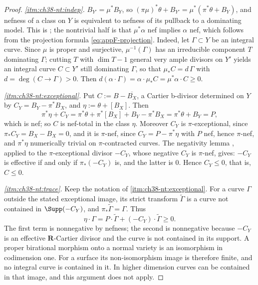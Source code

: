 \begin{proof}
\emph{\cref{itm:ch38-nt:indep}.}  $B_{Y'}=\mu^*B_Y$, so
$(\pi\mu)^*\theta+B_{Y'}=\mu^*(\pi^*\theta+B_Y)$, and nefness of a class
on $Y$ is equivalent to nefness of its pullback to a dominating model.
This is ; the nontrivial half is that
$\mu^*\alpha$ nef implies $\alpha$ nef, which follows from the
projection formula \eqref{eq:appF-projection}.  Indeed, let
$\Gamma\subset Y$ be an integral curve.  Since $\mu$ is proper and
surjective, $\mu^{-1}(\Gamma)$ has an irreducible component $T$
dominating $\Gamma$; cutting $T$ with $\dim T-1$ general very ample
divisors on $Y'$ yields an integral curve $C\subset Y'$ still
dominating $\Gamma$, so that $\mu_*C=d\,\Gamma$ with
$d=\deg(C\to\Gamma)>0$.  Then
$d(\alpha\cdot\Gamma)=\alpha\cdot\mu_*C=\mu^*\alpha\cdot C\geq0$.

\emph{\cref{itm:ch38-nt:exceptional}.}  Put $C:=B-\overline{B_X}$, a
Cartier b-divisor determined on $Y$ by $C_Y=B_Y-\pi^*B_X$, and
$\eta:=\theta+[B_X]$.  Then
\[
 \pi^*\eta+C_Y=\pi^*\theta+\pi^*[B_X]+B_Y-\pi^*B_X=\pi^*\theta+B_Y=P,
\]
which is nef; so $C$ is nef-total in the class $\eta$.  Moreover
$C_Y$ is $\pi$-exceptional, since
$\pi_*C_Y=B_X-B_X=0$, and it is $\pi$-nef, since
$C_Y=P-\pi^*\eta$ with $P$ nef, hence $\pi$-nef, and $\pi^*\eta$
numerically trivial on $\pi$-contracted curves.  The negativity lemma
\cite[Lemma~3.39]{KM08}, applied to the $\pi$-exceptional divisor
$-C_Y$, whose negative $C_Y$ is $\pi$-nef, gives: $-C_Y$ is
effective if and only if $\pi_*(-C_Y)$ is, and the latter is $0$.
Hence $C_Y\leq0$, that is, $C\leq0$.

\emph{\cref{itm:ch38-nt:trace}.} Keep the notation of
\cref{itm:ch38-nt:exceptional}. For a curve $\Gamma$ outside the
stated exceptional image, its strict transform $\widetilde\Gamma$
is a curve not contained in $\Supp(-C_Y)$, and
$\pi_*\widetilde\Gamma=\Gamma$. Thus
\[
 \eta\cdot\Gamma
 =P\cdot\widetilde\Gamma+(-C_Y)\cdot\widetilde\Gamma\geq0.
\]
The first term is nonnegative by nefness; the second is nonnegative
because $-C_Y$ is an effective $\mathbf R$-Cartier divisor and the
curve is not contained in its support. A proper birational morphism
onto a normal variety is an isomorphism in codimension one.
For a surface its non-isomorphism image is therefore finite, and
no integral curve is contained in it. In higher dimension curves
can be contained in that image, and this argument does not apply.
\end{proof}

